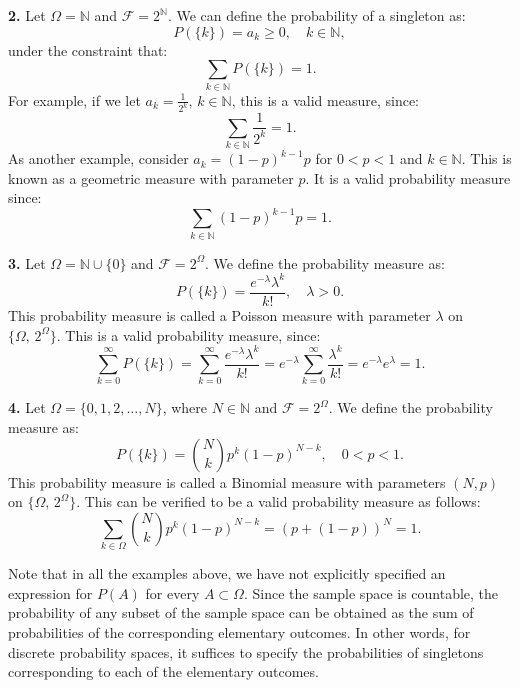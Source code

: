 \textbf{2.} Let \( \Omega = \mathbb{N} \) and \( \mathcal{F} = 2^{\mathbb{N}} \). We can define the probability of a singleton as:
\[
P(\{k\}) = a_k \geq 0, \quad k \in \mathbb{N},
\]
under the constraint that:
\[
\sum_{k \in \mathbb{N}} P(\{k\}) = 1.
\]
For example, if we let \( a_k = \frac{1}{2^k}, \, k \in \mathbb{N} \), this is a valid measure, since:
\[
\sum_{k \in \mathbb{N}} \frac{1}{2^k} = 1.
\]
As another example, consider \( a_k = (1 - p)^{k-1} p \) for \( 0 < p < 1 \) and \( k \in \mathbb{N} \). This is known as a geometric measure with parameter \( p \). It is a valid probability measure since:
\[
\sum_{k \in \mathbb{N}} (1 - p)^{k-1} p = 1.
\]

\textbf{3.} Let \( \Omega = \mathbb{N} \cup \{0\} \) and \( \mathcal{F} = 2^{\Omega} \). We define the probability measure as:
\[
P(\{k\}) = \frac{e^{-\lambda} \lambda^k}{k!}, \quad \lambda > 0.
\]
This probability measure is called a Poisson measure with parameter \( \lambda \) on \( \{\Omega, \, 2^{\Omega}\}  \). This is a valid probability measure, since:
\[
\sum_{k=0}^{\infty} P(\{k\}) = \sum_{k=0}^{\infty} \frac{e^{-\lambda} \lambda^k}{k!} = e^{-\lambda} \sum_{k=0}^{\infty} \frac{\lambda^k}{k!} = e^{-\lambda} e^{\lambda} = 1.
\]

\textbf{4.} Let \( \Omega = \{0, 1, 2, \ldots, N\} \), where \( N \in \mathbb{N} \) and \( \mathcal{F} = 2^{\Omega} \). We define the probability measure as:
\[
P(\{k\}) = \binom{N}{k} p^k (1 - p)^{N-k}, \quad 0 < p < 1.
\]
This probability measure is called a Binomial measure with parameters \( (N, p) \) on \( \{\Omega, \, 2^{\Omega}\} \). This can be verified to be a valid probability measure as follows:
\[
\sum_{k \in \Omega} \binom{N}{k} p^k (1 - p)^{N-k} = (p + (1 - p))^N = 1.
\]

Note that in all the examples above, we have not explicitly specified an expression for \( P(A) \) for every \( A \subset \Omega \). Since the sample space is countable, the probability of any subset of the sample space can be obtained as the sum of probabilities of the corresponding elementary outcomes. In other words, for discrete probability spaces, it suffices to specify the probabilities of singletons corresponding to each of the elementary outcomes.
